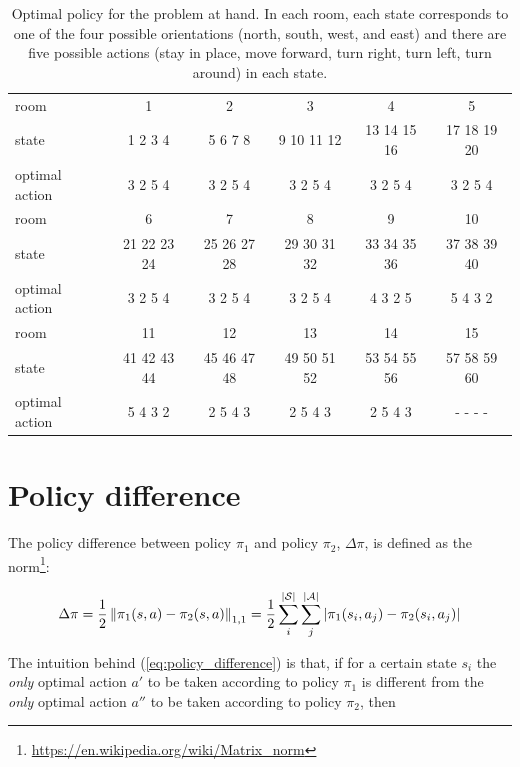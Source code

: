 \documentclass[a4paper]{article}
\begin{document}
\begin{table}[htbp]
\centering
\begin{tabular}{| p{1cm} | c c c c c |} 
 \hline
 room & 1 & 2 & 3 & 4 & 5 \\ %
 state & 1 2 3 4 & 5 6 7 8 & 9 10 11 12 & 13 14 15 16 & 17 18 19 20 \\
 \hline
 optimal action & 3 2 5 4 & 3 2 5 4 & 3 2 5 4 & 3 2 5 4 & 3 2 5 4 \\ 
 \hline\hline
 room & 6 & 7 & 8 & 9 & 10 \\ %
 state & 21 22 23 24 & 25 26 27 28 & 29 30 31 32 & 33 34 35 36 & 37 38 39 40 \\ %
 \hline
 optimal action & 3 2 5 4 & 3 2 5 4 & 3 2 5 4 & 4 3 2 5 & 5 4 3 2 \\ [1ex]
 \hline\hline
 room & 11 & 12 & 13 & 14 & 15\\ %
 state & 41 42 43 44 & 45 46 47 48 & 49 50 51 52 & 53 54 55 56 & 57 58 59 60\\ %
 \hline
 optimal action & 5 4 3 2 & 2 5 4 3 & 2 5 4 3 & 2 5 4 3 & - - - -\\ [1ex]
 \hline
\end{tabular}
\caption{Optimal policy for the problem at hand. In each room, each state corresponds to one of the four possible orientations (north, south, west, and east) and there are five possible actions (stay in place, move forward, turn right, turn left, turn around) in each state.}
\label{tab:optimal_policy}
\end{table}


\vfill
\newpage
\section{Policy difference}
\label{app_sec:policy_difference}
The policy difference between policy $\pi_1$ and policy $\pi_2$, $\Delta \pi$, is defined as the norm\footnote{\url{https://en.wikipedia.org/wiki/Matrix_norm}}:

\begin{align}
\label{eq:policy_difference}
\Delta \pi  = \frac{1}{2}  \left\| {\pi_{1} (s,a) - \pi_{2} (s,a)} \right\|_{1,1} = \frac{1}{2}  \sum\limits_{i}^{|{\cal S}|} \sum\limits_{j}^{|{\cal A}|} {\left| \pi_{1} (s_i, a_j) - \pi_{2} (s_i, a_j) \right|}
\end{align}

The intuition behind (\ref{eq:policy_difference}) is that, if for a certain state $s_i$ the \textit{only} optimal action $a'$ to be taken according to policy $\pi_1$ is different from the \textit{only} optimal action $a''$ to be taken according to policy $\pi_2$, then
\end{document}
